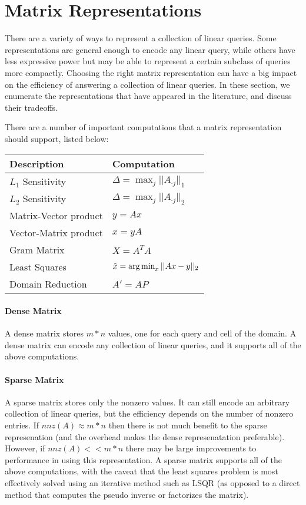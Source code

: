 \section{Matrix Representations}

There are a variety of ways to represent a collection of linear queries.  Some representations are general enough to encode any linear query, while others have less expressive power but may be able to represent a certain subclass of queries more compactly.  Choosing the right matrix representation can have a big impact on the efficiency of answering a collection of linear queries.  In these section, we enumerate the representations that have appeared in the literature, and discuss their tradeoffs.   

There are a number of important computations that a matrix representation should support, listed below:

\begin{table}
\centering
\begin{tabular}{l|l}
\textbf{Description} & \textbf{Computation} \\\hline
$L_1$ Sensitivity & $ \Delta = \max_{j} || A_{\cdot j} ||_1 $ \\
$L_2$ Sensitivity & $ \Delta = \max_{j} || A_{\cdot j} ||_2 $ \\
Matrix-Vector product & $ y = A x $ \\
Vector-Matrix product & $ x = y A $ \\
Gram Matrix & $ X = A^T A $ \\
Least Squares & $ \hat{x} = \operatorname*{arg\,min}_x || A x - y ||_2 $ \\
Domain Reduction & $ A' = A P $ \\
\end{tabular}
\end{table}

\paragraph*{Dense Matrix}

A dense matrix stores $m*n$ values, one for each query and cell of the domain.  A dense matrix can encode any collection of linear queries, and it supports all of the above computations.    

\paragraph*{Sparse Matrix}

A sparse matrix stores only the nonzero values.  It can still encode an arbitrary collection of linear queries, but the efficiency depends on the number of nonzero entries.  If $nnz(A) \approx m*n$ then there is not much benefit to the sparse represenation (and the overhead makes the dense represenatation preferable).  However, if $nnz(A) << m*n$ there may be large improvements to performance in using this representation.  A sparse matrix supports all of the above computations, with the caveat that the least squares problem is most effectively solved using an iterative method such as LSQR (as opposed to a direct method that computes the pseudo inverse or factorizes the matrix).  

